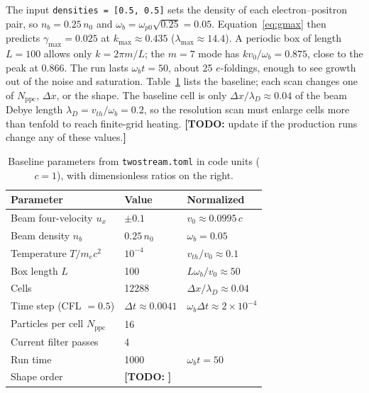 \documentclass[10pt,twocolumn,letterpaper]{article}
\newcommand{\wb}{\omega_b}            %
\newcommand{\vz}{v_0}                 %
\newcommand{\ppc}{N_\mathrm{ppc}}     %
\newif\ifdraft \drafttrue
\newcommand{\todo}[1]{\ifdraft{\color{red}\textbf{[TODO:} #1\textbf{]}}\fi}
\begin{document}
The input \texttt{densities = [0.5, 0.5]} sets the density of each electron--positron pair, so
$n_b=0.25\,n_0$ and $\wb=\omega_{p0}\sqrt{0.25}=0.05$. Equation~\eqref{eq:gmax} then predicts
$\gamma_{\max}=0.025$ at $k_{\max}\approx0.435$ ($\lambda_{\max}\approx14.4$). A periodic box
of length $L=100$ allows only $k=2\pi m/L$; the $m=7$ mode has $k\vz/\wb=0.875$, close to the
peak at $0.866$. The run lasts $\wb t=50$, about 25 $e$-foldings, enough to see growth out of
the noise and saturation. Table~\ref{tab:params} lists the baseline; each scan changes one of
$\ppc$, $\Delta x$, or the shape. The baseline cell is only $\Delta x/\lambda_D\approx0.04$ of
the beam Debye length $\lambda_D=v_{th}/\wb=0.2$, so the resolution scan must enlarge cells more
than tenfold to reach finite-grid heating.
\todo{update if the production runs change any of these values.}

\begin{table}[t]
  \centering
  \caption{Baseline parameters from \texttt{twostream.toml} in code units ($c=1$), with
  dimensionless ratios on the right.}
  \label{tab:params}
  \small
  \begin{tabular}{@{}lll@{}}
    \toprule
    Parameter & Value & Normalized \\
    \midrule
    Beam four-velocity $u_x$            & $\pm0.1$            & $\vz\approx0.0995\,c$ \\
    Beam density $n_b$                  & $0.25\,n_0$         & $\wb=0.05$ \\
    Temperature $T/m_ec^2$              & $10^{-4}$           & $v_{th}/\vz\approx0.1$ \\
    Box length $L$                      & 100                 & $L\wb/\vz\approx50$ \\
    Cells                               & 12288               & $\Delta x/\lambda_D\approx0.04$ \\
    Time step (CFL $=0.5$)              & $\Delta t\approx0.0041$ & $\wb\Delta t\approx2\times10^{-4}$ \\
    Particles per cell $\ppc$           & 16                  & \\
    Current filter passes               & 4                   & \\
    Run time                            & 1000                & $\wb t=50$ \\
    Shape order                         & \todo{}             & \\
    \bottomrule
  \end{tabular}
\end{table}
\end{document}
